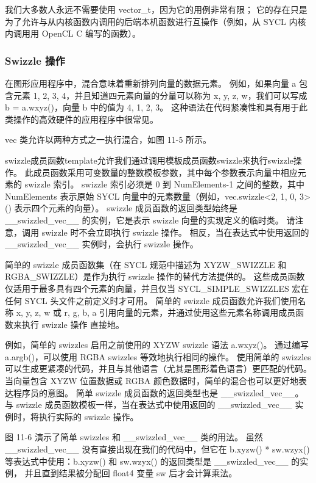 我们大多数人永远不需要使用 vector\_t，因为它的用例非常有限； 它的存在只是为了允许与从内核函数内调用的后端本机函数进行互操作（例如，从 SYCL 内核内调用用 OpenCL C 编写的函数）。

\subsubsection{Swizzle 操作}
在图形应用程序中，混合意味着重新排列向量的数据元素。 例如，如果向量 a 包含元素 {1, 2, 3, 4}，并且知道四元素向量的分量可以称为 {x, y, z, w}，我们可以写成 b = a.wxyz()，向量 b 中的值为 {4, 1, 2, 3}。 这种语法在代码紧凑性和具有用于此类操作的高效硬件的应用程序中很常见。

vec 类允许以两种方式之一执行混合，如图 11-5 所示。

swizzle成员函数template允许我们通过调用模板成员函数swizzle来执行swizzle操作。 此成员函数采用可变数量的整数模板参数，其中每个参数表示向量中相应元素的 swizzle 索引。 swizzle 索引必须是 0 到 NumElements-1 之间的整数，其中 NumElements 表示原始 SYCL 向量中的元素数量（例如，vec.swizzle<2, 1, 0, 3>() 表示四个元素的向量）。 swizzle 成员函数的返回类型始终是 \_\_swizzled\_vec\_\_ 的实例，它是表示 swizzle 向量的实现定义的临时类。 请注意，调用 swizzle 时不会立即执行 swizzle 操作。 相反，当在表达式中使用返回的 \_\_swizzled\_vec\_\_ 实例时，会执行 swizzle 操作。

简单的 swizzle 成员函数集（在 SYCL 规范中描述为 XYZW\_SWIZZLE 和 RGBA\_SWIZZLE）是作为执行 swizzle 操作的替代方法提供的。 这些成员函数仅适用于最多具有四个元素的向量，并且仅当 SYCL\_SIMPLE\_SWIZZLES 宏在任何 SYCL 头文件之前定义时才可用。 简单的 swizzle 成员函数允许我们使用名称 {x, y, z, w} 或 {r, g, b, a} 引用向量的元素，并通过使用这些元素名称调用成员函数来执行 swizzle 操作 直接地。

例如，简单的 swizzles 启用之前使用的 XYZW swizzle 语法 a.wxyz()。 通过编写 a.argb()，可以使用 RGBA swizzles 等效地执行相同的操作。 使用简单的 swizzles 可以生成更紧凑的代码，并且与其他语言（尤其是图形着色语言）更匹配的代码。 当向量包含 XYZW 位置数据或 RGBA 颜色数据时，简单的混合也可以更好地表达程序员的意图。 简单 swizzle 成员函数的返回类型也是 \_\_swizzled\_vec\_\_。 与 swizzle 成员函数模板一样，当在表达式中使用返回的 \_\_swizzled\_vec\_\_ 实例时，将执行实际的 swizzle 操作。

图 11-6 演示了简单 swizzles 和 \_\_swizzled\_vec\_\_ 类的用法。 虽然 \_\_swizzled\_vec\_\_ 没有直接出现在我们的代码中，但它在 b.xyzw() * sw.wzyx() 等表达式中使用：b.xyzw() 和 sw.wzyx() 的返回类型是 \_\_swizzled\_vec\_\_ 的实例， 并且直到结果被分配回 float4 变量 sw 后才会计算乘法。

